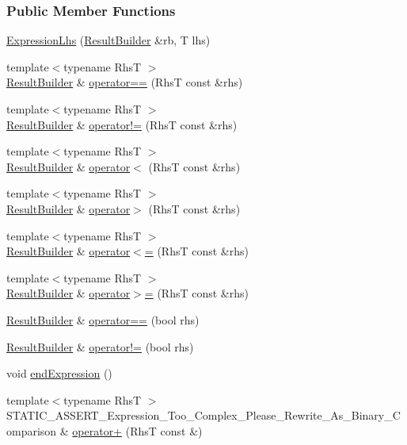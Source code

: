 \subsubsection*{Public Member Functions}
\begin{DoxyCompactItemize}
\item 
\hyperlink{a00028_aa829588def6146a94fb75de9c4cc482a}{Expression\+Lhs} (\hyperlink{a00067}{Result\+Builder} \&rb, T lhs)
\item 
{\footnotesize template$<$typename Rhs\+T $>$ }\\\hyperlink{a00067}{Result\+Builder} \& \hyperlink{a00028_a2f7ad442c3e5e5764eee736345c40301}{operator==} (Rhs\+T const \&rhs)
\item 
{\footnotesize template$<$typename Rhs\+T $>$ }\\\hyperlink{a00067}{Result\+Builder} \& \hyperlink{a00028_a44df9974cf20fcfda4e5b6b3c01d5f93}{operator!=} (Rhs\+T const \&rhs)
\item 
{\footnotesize template$<$typename Rhs\+T $>$ }\\\hyperlink{a00067}{Result\+Builder} \& \hyperlink{a00028_a48428d358ddc89729e2e3407f4024dac}{operator$<$} (Rhs\+T const \&rhs)
\item 
{\footnotesize template$<$typename Rhs\+T $>$ }\\\hyperlink{a00067}{Result\+Builder} \& \hyperlink{a00028_ad3602a7ad945c751004065b1007dc183}{operator$>$} (Rhs\+T const \&rhs)
\item 
{\footnotesize template$<$typename Rhs\+T $>$ }\\\hyperlink{a00067}{Result\+Builder} \& \hyperlink{a00028_afd188990e8a14b49c308ce7a79056846}{operator$<$=} (Rhs\+T const \&rhs)
\item 
{\footnotesize template$<$typename Rhs\+T $>$ }\\\hyperlink{a00067}{Result\+Builder} \& \hyperlink{a00028_a21d30d6026ff2b1f86ddbd6b0a90d036}{operator$>$=} (Rhs\+T const \&rhs)
\item 
\hyperlink{a00067}{Result\+Builder} \& \hyperlink{a00028_a6001030bcfbabc3981013ddffb3e3bb6}{operator==} (bool rhs)
\item 
\hyperlink{a00067}{Result\+Builder} \& \hyperlink{a00028_a71e48da9a894962e8b32a8af5359a4df}{operator!=} (bool rhs)
\item 
void \hyperlink{a00028_a13d2551a927790284fb5ddf1ee2c9079}{end\+Expression} ()
\item 
{\footnotesize template$<$typename Rhs\+T $>$ }\\S\+T\+A\+T\+I\+C\+\_\+\+A\+S\+S\+E\+R\+T\+\_\+\+Expression\+\_\+\+Too\+\_\+\+Complex\+\_\+\+Please\+\_\+\+Rewrite\+\_\+\+As\+\_\+\+Binary\+\_\+\+Comparison \& \hyperlink{a00028_a29ffb8417e977f0a98c0eb537a7ca5af}{operator+} (Rhs\+T const \&)

\end{DoxyCompactItemize}
